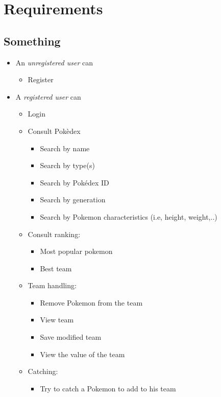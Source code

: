 \section{Requirements}
\subsection{Something}
\begin{itemize}
    \item An \textit{unregistered user} can
    \begin{itemize}
        \item Register
    \end{itemize}
    \item A \textit{registered user} can
    \begin{itemize}
        \item Login
        \item Consult Pokèdex
        \begin{itemize}
            \item Search by name
            \item Search by type(s)
            \item Search by Pokédex ID
            \item Search by generation  
            \item Search by Pokemon characteristics (i.e, height, weight,..)	
        \end{itemize}
        \item Consult ranking:
        \begin{itemize}
            \item Most popular pokemon
            \item Best team
        \end{itemize}
        \item Team handling:
        \begin{itemize}
            \item Remove Pokemon from the team
            \item View team
            \item Save modified team
            \item View the value of the team
        \end{itemize}
        \item Catching:
        \begin{itemize}
            \item Try to catch a Pokemon to add to his team
        \end{itemize}

\end{itemize}
\end{itemize}
